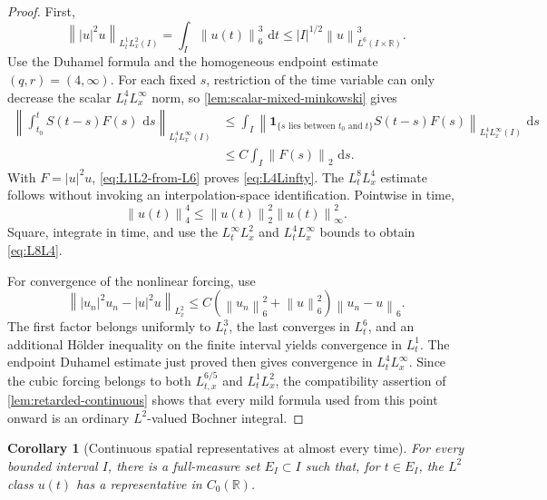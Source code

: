 \documentclass[11pt,oneside]{book}
\newtheorem{corollary}[theorem]{Corollary}
\theoremstyle{definition}
\theoremstyle{remark}
\newcommand{\R}{\mathbb R}
\newcommand{\1}{\mathbf 1}
\newcommand{\dd}{\,\mathrm d}
\newcommand{\norm}[1]{\left\lVert #1\right\rVert}
\begin{document}
\begin{proof}
First,
\begin{equation}
 \norm{|u|^2u}_{L^1_tL^2_x(I)}
 =\int_I\norm{u(t)}_6^3\,\dd t
 \le |I|^{1/2}\norm u_{L^6(I\times\R)}^3.           \label{eq:L1L2-from-L6}
\end{equation}
Use the Duhamel formula and the homogeneous endpoint estimate
$(q,r)=(4,\infty)$.  For each fixed $s$, restriction of the time variable can
only decrease the scalar $L^4_tL^\infty_x$ norm, so
\cref{lem:scalar-mixed-minkowski} gives
\begin{align*}
 \left\|\int_{t_0}^{t}S(t-s)F(s)\,\dd s\right\|_{L^4_tL^\infty_x(I)}
 &\le\int_I
   \norm{\1_{\{s\text{ lies between }t_0\text{ and }t\}}
             S(t-s)F(s)}_{L^4_tL^\infty_x(I)}\,\dd s\\
 &\le C\int_I\norm{F(s)}_2\,\dd s.
\end{align*}
With $F=|u|^2u$, \eqref{eq:L1L2-from-L6} proves \eqref{eq:L4Linfty}.
The $L^8_tL^4_x$ estimate follows without invoking an interpolation-space
identification.  Pointwise in time,
\[
 \norm{u(t)}_4^4\le\norm{u(t)}_2^2\norm{u(t)}_\infty^2.
\]
Square, integrate in time, and use the $L^\infty_tL^2_x$ and
$L^4_tL^\infty_x$ bounds to obtain \eqref{eq:L8L4}.

For convergence of the nonlinear forcing, use
\[
 \norm{|u_n|^2u_n-|u|^2u}_{L^2_x}
 \le C(\norm{u_n}_6^2+\norm u_6^2)\norm{u_n-u}_6.
\]
The first factor belongs uniformly to $L^3_t$, the last converges in $L^6_t$,
and an additional H\"older inequality on the finite interval yields
convergence in $L^1_t$.  The endpoint Duhamel estimate just proved then gives
convergence in $L^4_tL^\infty_x$.  Since the cubic forcing belongs to both
$L^{6/5}_{t,x}$ and $L^1_tL^2_x$, the compatibility assertion of
\cref{lem:retarded-continuous} shows that every mild formula used from this
point onward is an ordinary $L^2$-valued Bochner integral.
\end{proof}

\begin{corollary}[Continuous spatial representatives at almost every time]
\label{cor:C0-slices}
For every bounded interval $I$, there is a full-measure set $E_I\subset I$
such that, for $t\in E_I$, the $L^2$ class $u(t)$ has a representative in
$C_0(\R)$.
\end{corollary}
\end{document}
